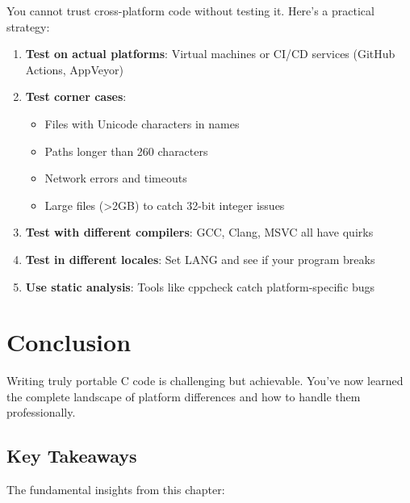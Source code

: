 You cannot trust cross-platform code without testing it. Here's a practical strategy:

\begin{enumerate}
    \item \textbf{Test on actual platforms}: Virtual machines or CI/CD services (GitHub Actions, AppVeyor)

    \item \textbf{Test corner cases}:
    \begin{itemize}
        \item Files with Unicode characters in names
        \item Paths longer than 260 characters
        \item Network errors and timeouts
        \item Large files (>2GB) to catch 32-bit integer issues
    \end{itemize}

    \item \textbf{Test with different compilers}: GCC, Clang, MSVC all have quirks

    \item \textbf{Test in different locales}: Set LANG and see if your program breaks

    \item \textbf{Use static analysis}: Tools like cppcheck catch platform-specific bugs
\end{enumerate}

\section{Conclusion}

Writing truly portable C code is challenging but achievable. You've now learned the complete landscape of platform differences and how to handle them professionally.

\subsection{Key Takeaways}

The fundamental insights from this chapter:

